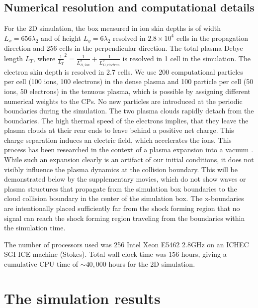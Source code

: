 \documentclass[structabstract]{aa}
\begin{document}
\subsection{Numerical resolution and computational details}
For the 2D simulation, the box measured in ion skin depths is of width $L_x=656 \lambda_2$ and of height $L_y=6
\lambda_2$ resolved in $2.8\times10^{4}$ cells in the propagation direction and 256 cells in the perpendicular 
direction. The total plasma Debye length $L_{T}$, where $\frac{1}{L_T}^2 = \frac{1}{L_{D,ion}^2} + \frac{1}
{L_{D,electron}^2}$ is resolved in 1 cell in the simulation. The electron skin depth is resolved in 2.7 cells. 
{ We use 200 computational particles per cell (100 ions, 100 electrons) in the dense plasma and 100 particle per cell (50 ions, 50 electrons) in the tenuous plasma, 
which is possible by assigning different numerical weights to the CPs. }
No new particles are introduced at the 
periodic boundaries during the simulation. The two plasma clouds rapidly detach from the boundaries. 
{ The high
thermal speed of the electrons implies, that they leave the plasma clouds 
at their rear ends to leave behind a positive net charge. This charge 
separation induces an electric field, which accelerates the ions. This 
process has been researched in the context of a plasma expansion into a 
vacuum \citep{Mora:2009qy}. While such an expansion clearly is an artifact of our initial 
conditions, it does not visibly influence the plasma dynamics at the 
collision boundary. This will be demonstrated below by the supplementary 
movies, which do not show waves or plasma structures that propagate from 
the simulation box boundaries to the cloud collision boundary in the center 
of the simulation box.}
The 
x-boundaries are intentionally placed sufficiently far from the shock forming region that no signal can reach 
the shock forming region traveling from the boundaries within the simulation time.

The number of processors used was 256 Intel Xeon E5462 2.8GHz on an ICHEC 
SGI ICE machine (Stokes). { Total wall clock time was $156 $ hours, giving a cumulative CPU time of $\sim 40,000$ hours for the 
2D simulation.}

%


\section{The simulation results}
\label{Results}
\end{document}

